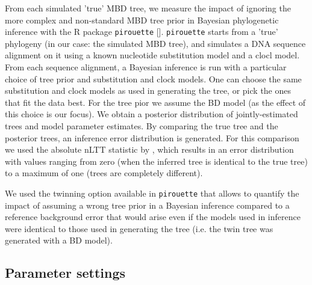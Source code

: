 From each simulated 'true' MBD tree, we measure the impact of
ignoring the more complex and non-standard MBD tree prior in
Bayesian phylogenetic inference with the R package \verb;pirouette; [\citep{pirouette}].
 \verb;pirouette; starts from a 'true'  phylogeny (in our case: the simulated MBD tree), and simulates a DNA sequence alignment on it using a known nucleotide substitution model and a clocl model. 
From each sequence alignment, a Bayesian inference is run with a particular choice of tree prior and substitution and clock models. One can choose the same substitution and clock models as used in generating the tree, or pick the ones that fit the data best. For the tree pior we assume the BD model (as the effect of this choice is our focus). We obtain a posterior distribution of jointly-estimated trees and model parameter estimates.
By comparing the true tree and the posterior trees, an inference error distribution is generated. For this comparison we used the absolute nLTT statistic by \citet{janzen2015}, which results in an error distribution with values ranging from zero (when the inferred tree is identical to the true tree) to a maximum of one (trees are completely different).

We used the twinning option available in \verb;pirouette; that allows to quantify the impact of assuming a wrong tree prior in a Bayesian inference compared to a reference background error that would arise even if the models used in inference were identical to those used in generating the tree (i.e. the twin tree was generated with a BD model).


\subsection{Parameter settings}

